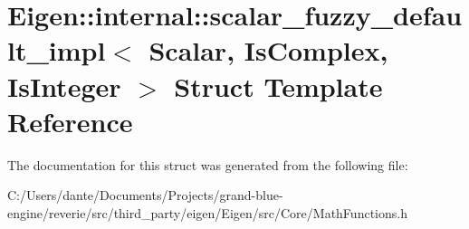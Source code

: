 \hypertarget{struct_eigen_1_1internal_1_1scalar__fuzzy__default__impl}{}\section{Eigen\+::internal\+::scalar\+\_\+fuzzy\+\_\+default\+\_\+impl$<$ Scalar, Is\+Complex, Is\+Integer $>$ Struct Template Reference}
\label{struct_eigen_1_1internal_1_1scalar__fuzzy__default__impl}


The documentation for this struct was generated from the following file\+:\begin{DoxyCompactItemize}
\item 
C\+:/\+Users/dante/\+Documents/\+Projects/grand-\/blue-\/engine/reverie/src/third\+\_\+party/eigen/\+Eigen/src/\+Core/Math\+Functions.\+h\end{DoxyCompactItemize}

